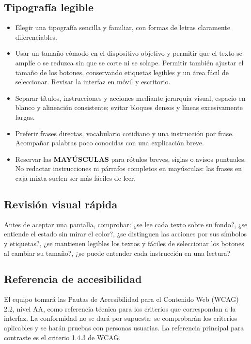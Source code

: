 \subsection{Tipografía legible}
\begin{itemize}[leftmargin=*]
  \item Elegir una tipografía sencilla y familiar, con formas de letras claramente diferenciables.
  \item Usar un tamaño cómodo en el dispositivo objetivo y permitir que el texto se amplíe o se reduzca sin que se corte ni se solape. Permitir también ajustar el tamaño de los botones, conservando etiquetas legibles y un área fácil de seleccionar. Revisar la interfaz en móvil y escritorio.
  \item Separar títulos, instrucciones y acciones mediante jerarquía visual, espacio en blanco y alineación consistente; evitar bloques densos y líneas excesivamente largas.
  \item Preferir frases directas, vocabulario cotidiano y una instrucción por frase. Acompañar palabras poco conocidas con una explicación breve.
  \item Reservar las \textbf{MAYÚSCULAS} para rótulos breves, siglas o avisos puntuales. No redactar instrucciones ni párrafos completos en mayúsculas: las frases en caja mixta suelen ser más fáciles de leer.
\end{itemize}

\subsection{Revisión visual rápida}
Antes de aceptar una pantalla, comprobar: ¿se lee cada texto sobre su fondo?, ¿se entiende el estado sin mirar el color?, ¿se distinguen las acciones por sus símbolos y etiquetas?, ¿se mantienen legibles los textos y fáciles de seleccionar los botones al cambiar su tamaño?, ¿se puede entender cada instrucción en una lectura?

\subsection{Referencia de accesibilidad}
El equipo tomará las Pautas de Accesibilidad para el Contenido Web (WCAG) 2.2, nivel AA, como referencia técnica para los criterios que correspondan a la interfaz. La conformidad no se dará por supuesta: se comprobarán los criterios aplicables y se harán pruebas con personas usuarias. La referencia principal para contraste es el criterio 1.4.3 de WCAG.
